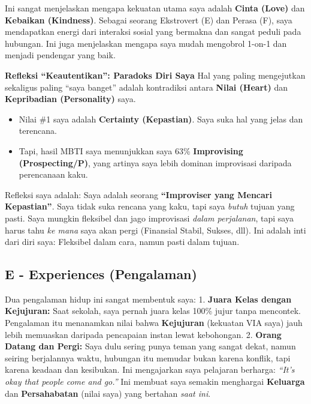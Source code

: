\documentclass[
  letterpaper,
  DIV=11,
  numbers=noendperiod]{scrreprt}
\providecommand{\tightlist}{%
  \setlength{\itemsep}{0pt}\setlength{\parskip}{0pt}}
\begin{document}
Ini sangat menjelaskan mengapa kekuatan utama saya adalah \textbf{Cinta
(Love)} dan \textbf{Kebaikan (Kindness)}. Sebagai seorang Ekstrovert (E)
dan Perasa (F), saya mendapatkan energi dari interaksi sosial yang
bermakna dan sangat peduli pada hubungan. Ini juga menjelaskan mengapa
saya mudah mengobrol 1-on-1 dan menjadi pendengar yang baik.

\textbf{Refleksi ``Keautentikan'': Paradoks Diri Saya} Hal yang paling
mengejutkan sekaligus paling ``saya banget'' adalah kontradiksi antara
\textbf{Nilai (Heart)} dan \textbf{Kepribadian (Personality)} saya.

\begin{itemize}
\tightlist
\item
  Nilai \#1 saya adalah \textbf{Certainty (Kepastian)}. Saya suka hal
  yang jelas dan terencana.
\item
  Tapi, hasil MBTI saya menunjukkan saya 63\% \textbf{Improvising
  (Prospecting/P)}, yang artinya saya lebih dominan improvisasi daripada
  perencanaan kaku.
\end{itemize}

Refleksi saya adalah: Saya adalah seorang \textbf{``Improviser yang
Mencari Kepastian''}. Saya tidak suka rencana yang kaku, tapi saya
\emph{butuh} tujuan yang pasti. Saya mungkin fleksibel dan jago
improvisasi \emph{dalam perjalanan}, tapi saya harus tahu \emph{ke mana}
saya akan pergi (Finansial Stabil, Sukses, dll). Ini adalah inti dari
diri saya: Fleksibel dalam cara, namun pasti dalam tujuan.

\subsection{E - Experiences
(Pengalaman)}\label{e---experiences-pengalaman}

Dua pengalaman hidup ini sangat membentuk saya: 1. \textbf{Juara Kelas
dengan Kejujuran:} Saat sekolah, saya pernah juara kelas 100\% jujur
tanpa mencontek. Pengalaman itu menanamkan nilai bahwa
\textbf{Kejujuran} (kekuatan VIA saya) jauh lebih memuaskan daripada
pencapaian instan lewat kebohongan. 2. \textbf{Orang Datang dan Pergi:}
Saya dulu sering punya teman yang sangat dekat, namun seiring
berjalannya waktu, hubungan itu memudar bukan karena konflik, tapi
karena keadaan dan kesibukan. Ini mengajarkan saya pelajaran berharga:
\emph{``It's okay that people come and go.''} Ini membuat saya semakin
menghargai \textbf{Keluarga} dan \textbf{Persahabatan} (nilai saya) yang
bertahan \emph{saat ini}.
\end{document}
